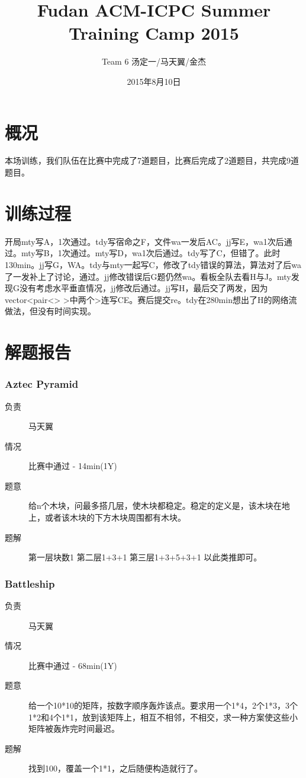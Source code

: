 \documentclass[a4paper, 11pt, nofonts, nocap, fancyhdr]{ctexart}
\title{Fudan ACM-ICPC Summer Training Camp 2015}
\author{Team 6 汤定一/马天翼/金杰}
\date{2015年8月10日}
\newcommand{\problem}[1]{\subsubsection{#1}}
\begin{document}
\maketitle

\section{概况}

本场训练，我们队伍在比赛中完成了7道题目，比赛后完成了2道题目，共完成9道题目。

\section{训练过程}

开局mty写A，1次通过。tdy写宿命之F，文件wa一发后AC。jj写E，wa1次后通过。mty写B，1次通过。mty写D，wa1次后通过。tdy写了C，但错了。此时130min。jj写G，WA。tdy与mty一起写C，修改了tdy错误的算法，算法对了后wa了一发补上了讨论，通过。jj修改错误后G题仍然wa。看板全队去看H与J。mty发现G没有考虑水平垂直情况，jj修改后通过。jj写H，最后交了两发，因为vector<pair<> >中两个>连写CE。赛后提交re。tdy在280min想出了H的网络流做法，但没有时间实现。

\section{解题报告}

\problem{Aztec Pyramid}

\begin{description}
\item[负责] 马天翼
\item[情况] 比赛中通过 - 14min(1Y)
\item[题意]
给n个木块，问最多搭几层，使木块都稳定。稳定的定义是，该木块在地上，或者该木块的下方木块周围都有木块。
\item[题解]
第一层块数1
第二层1+3+1
第三层1+3+5+3+1
以此类推即可。
\end{description}

\problem{Battleship}

\begin{description}
\item[负责] 马天翼
\item[情况] 比赛中通过 - 68min(1Y)
\item[题意]
给一个10*10的矩阵，按数字顺序轰炸该点。要求用一个1*4，2个1*3，3个1*2和4个1*1，放到该矩阵上，相互不相邻，不相交，求一种方案使这些小矩阵被轰炸完时间最迟。
\item[题解]
找到100，覆盖一个1*1，之后随便构造就行了。
\end{description}
\end{document}
